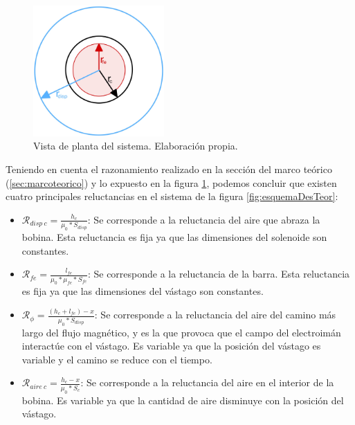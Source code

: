 \begin{figure}[H]
    \centering
    \includegraphics[width=5cm]{FigurasMemoria/areasFlujo.jpg}
    \caption{Vista de planta del sistema. Elaboración propia.}
    \label{fig:areasFlujo} %
\end{figure}

Teniendo en cuenta el razonamiento realizado en la sección del marco teórico (\ref{sec:marcoteorico}) y lo expuesto en la figura \ref{fig:areasFlujo}, podemos concluir que existen cuatro principales reluctancias en el sistema de la figura \ref{fig:esquemaDesTeor}:

\begin{itemize}
    \item \(\mathcal{R}_{disp~c}=\frac{h_c}{\mu_0*S_{disp}}\): Se corresponde a la reluctancia del aire que abraza la bobina. Esta reluctancia es fija ya que las dimensiones del solenoide son constantes.
    \item \(\mathcal{R}_{fe}=\frac{l_{fe}}{\mu_0*\mu_{fe}*S_{fe}}\): Se corresponde a la reluctancia de la barra. Esta reluctancia es fija ya que las dimensiones del vástago son constantes.
    \item \(\mathcal{R}_{\phi}=\frac{(h_c+l_{fe})-x}{\mu_0*S_{disp}}\): Se corresponde a la reluctancia del aire del camino más largo del flujo magnético, y es la que provoca que el campo del electroimán interactúe con el vástago. Es variable ya que la posición del vástago es variable y el camino se reduce con el tiempo.
    \item \(\mathcal{R}_{aire~c}=\frac{h_c-x}{\mu_0*S_c}\): Se corresponde a la reluctancia del aire en el interior de la bobina. Es variable ya que la cantidad de aire disminuye con la posición del vástago.
\end{itemize}

